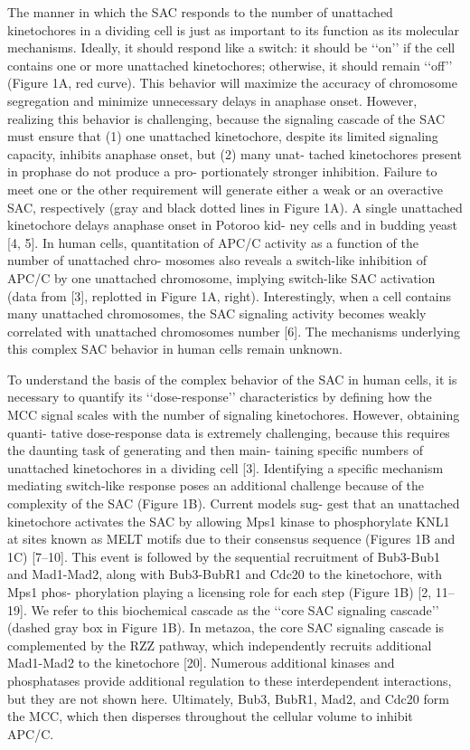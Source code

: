 The manner in which the SAC responds to the number of unattached kinetochores in a dividing cell is just as important to its function as its molecular mechanisms. Ideally, it should respond like a switch: it should be ‘‘on’’ if the cell contains one or more unattached kinetochores; otherwise, it should remain ‘‘off’’ (Figure 1A, red curve). This behavior will maximize the accuracy of chromosome segregation and minimize unnecessary delays in anaphase onset. However, realizing this behavior is challenging, because the signaling cascade of the SAC must ensure that (1) one unattached kinetochore, despite its limited signaling capacity, inhibits anaphase onset, but (2) many unat- tached kinetochores present in prophase do not produce a pro- portionately stronger inhibition. Failure to meet one or the other requirement will generate either a weak or an overactive SAC, respectively (gray and black dotted lines in Figure 1A). A single unattached kinetochore delays anaphase onset in Potoroo kid- ney cells and in budding yeast [4, 5]. In human cells, quantitation of APC/C activity as a function of the number of unattached chro- mosomes also reveals a switch-like inhibition of APC/C by one unattached chromosome, implying switch-like SAC activation (data from [3], replotted in Figure 1A, right). Interestingly, when a cell contains many unattached chromosomes, the SAC signaling activity becomes weakly correlated with unattached chromosomes number [6]. The mechanisms underlying this complex SAC behavior in human cells remain unknown.

To understand the basis of the complex behavior of the SAC in human cells, it is necessary to quantify its ‘‘dose-response’’ characteristics by defining how the MCC signal scales with the number of signaling kinetochores. However, obtaining quanti- tative dose-response data is extremely challenging, because this requires the daunting task of generating and then main-
taining specific numbers of unattached kinetochores in a dividing cell [3]. Identifying a specific mechanism mediating switch-like response poses an additional challenge because of the complexity of the SAC (Figure 1B). Current models sug- gest that an unattached kinetochore activates the SAC by allowing Mps1 kinase to phosphorylate KNL1 at sites known as MELT motifs due to their consensus sequence (Figures 1B and 1C) [7–10]. This event is followed by the sequential recruitment of Bub3-Bub1 and Mad1-Mad2, along with Bub3-BubR1 and Cdc20 to the kinetochore, with Mps1 phos- phorylation playing a licensing role for each step (Figure 1B) [2, 11–19]. We refer to this biochemical cascade as the ‘‘core SAC signaling cascade’’ (dashed gray box in Figure 1B). In metazoa, the core SAC signaling cascade is complemented by the RZZ pathway, which independently recruits additional Mad1-Mad2 to the kinetochore [20]. Numerous additional kinases and phosphatases provide additional regulation to these interdependent interactions, but they are not shown here. Ultimately, Bub3, BubR1, Mad2, and Cdc20 form the MCC, which then disperses throughout the cellular volume to inhibit APC/C.

